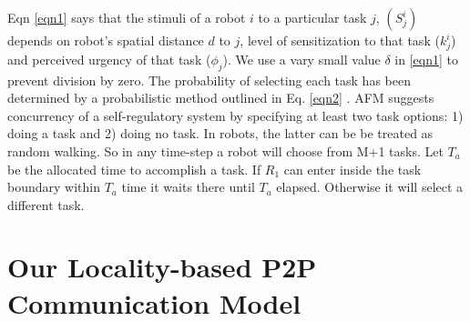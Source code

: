 \documentclass[letterpaper, 10 pt, conference]{ieeeconf}  %
\begin{document}
Eqn \ref{eqn1} says that the stimuli of a robot $i$ to a particular task $j$, $(S_{j}^{i})$ depends on robot's spatial distance $d$ to $j$, level of sensitization to that task ($k_{j}^{i}$) and perceived urgency of that task ($\phi _{j}$). We use a vary small value $\delta$ in \ref{eqn1} to prevent  division by zero. The probability of selecting each task has been determined by a probabilistic method outlined in Eq. \ref{eqn2} . 
AFM suggests concurrency of a self-regulatory system by specifying at least two task options: 1) doing a task and 2) doing no task. In robots, the latter can be   be treated as random walking. So in any time-step a robot will choose from M+1 tasks. Let $T_a$ be the allocated time to accomplish a task. If $R_1$ can enter inside the task boundary within $T_a$ time it waits there until $T_a$ elapsed. Otherwise it will select a different task. 
\section{Our Locality-based P2P Communication Model}
\label{sec:comm}
\end{document}
